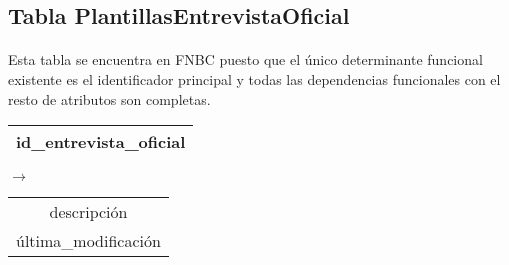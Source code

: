 \subsection{Tabla PlantillasEntrevistaOficial}

  \paragraph{}Esta tabla se encuentra en FNBC puesto que el único determinante
  funcional existente es el identificador principal y todas las dependencias
  funcionales con el resto de atributos son completas.

  \begin{center}
    \begin{minipage}{3.9cm}{\begin{flushright}\begin{tabular}{ | c | }
                  \hline
                  id\_entrevista\_oficial \\
                  \hline
                 \end{tabular}\end{flushright} }
    \end{minipage}
    \begin{minipage}{0.7cm}{$\longrightarrow$}
    \end{minipage}
    \begin{minipage}{5.9cm}{\begin{tabular}{ | c | }
                  \hline
                  descripción \\
                  última\_modificación \\
                  \hline
                 \end{tabular} }
    \end{minipage}
  \end{center}

